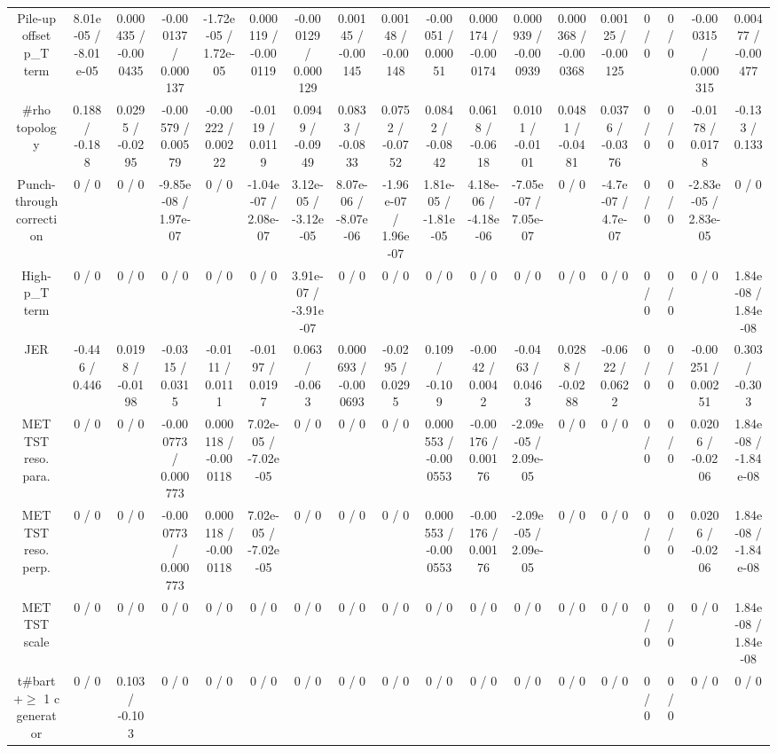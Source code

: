 \documentclass[10pt]{article}
\begin{document}
\begin{table}[htbp]
\begin{center}
\begin{tabular}{|c|c|c|c|c|c|c|c|c|c|c|c|c|c|c|c|c|c|}
  Pile-up offset p_{T} term & 8.01e-05 / -8.01e-05 & 0.000435 / -0.000435 & -0.000137 / 0.000137 & -1.72e-05 / 1.72e-05 & 0.000119 / -0.000119 & -0.000129 / 0.000129 & 0.00145 / -0.00145 & 0.00148 / -0.00148 & -0.00051 / 0.00051 & 0.000174 / -0.000174 & 0.000939 / -0.000939 & 0.000368 / -0.000368 & 0.00125 / -0.00125 & 0 / 0 & 0 / 0 & -0.000315 / 0.000315 & 0.00477 / -0.00477 \\ 
  #rho topology & 0.188 / -0.188 & 0.0295 / -0.0295 & -0.00579 / 0.00579 & -0.00222 / 0.00222 & -0.0119 / 0.0119 & 0.0949 / -0.0949 & 0.0833 / -0.0833 & 0.0752 / -0.0752 & 0.0842 / -0.0842 & 0.0618 / -0.0618 & 0.0101 / -0.0101 & 0.0481 / -0.0481 & 0.0376 / -0.0376 & 0 / 0 & 0 / 0 & -0.0178 / 0.0178 & -0.133 / 0.133 \\ 
  Punch-through correction & 0 / 0 & 0 / 0 & -9.85e-08 / 1.97e-07 & 0 / 0 & -1.04e-07 / 2.08e-07 & 3.12e-05 / -3.12e-05 & 8.07e-06 / -8.07e-06 & -1.96e-07 / 1.96e-07 & 1.81e-05 / -1.81e-05 & 4.18e-06 / -4.18e-06 & -7.05e-07 / 7.05e-07 & 0 / 0 & -4.7e-07 / 4.7e-07 & 0 / 0 & 0 / 0 & -2.83e-05 / 2.83e-05 & 0 / 0 \\ 
  High-p_{T} term & 0 / 0 & 0 / 0 & 0 / 0 & 0 / 0 & 0 / 0 & 3.91e-07 / -3.91e-07 & 0 / 0 & 0 / 0 & 0 / 0 & 0 / 0 & 0 / 0 & 0 / 0 & 0 / 0 & 0 / 0 & 0 / 0 & 0 / 0 & 1.84e-08 / 1.84e-08 \\ 
  JER & -0.446 / 0.446 & 0.0198 / -0.0198 & -0.0315 / 0.0315 & -0.0111 / 0.0111 & -0.0197 / 0.0197 & 0.063 / -0.063 & 0.000693 / -0.000693 & -0.0295 / 0.0295 & 0.109 / -0.109 & -0.0042 / 0.0042 & -0.0463 / 0.0463 & 0.0288 / -0.0288 & -0.0622 / 0.0622 & 0 / 0 & 0 / 0 & -0.00251 / 0.00251 & 0.303 / -0.303 \\ 
  MET TST reso. para. & 0 / 0 & 0 / 0 & -0.000773 / 0.000773 & 0.000118 / -0.000118 & 7.02e-05 / -7.02e-05 & 0 / 0 & 0 / 0 & 0 / 0 & 0.000553 / -0.000553 & -0.00176 / 0.00176 & -2.09e-05 / 2.09e-05 & 0 / 0 & 0 / 0 & 0 / 0 & 0 / 0 & 0.0206 / -0.0206 & 1.84e-08 / -1.84e-08 \\ 
  MET TST reso. perp. & 0 / 0 & 0 / 0 & -0.000773 / 0.000773 & 0.000118 / -0.000118 & 7.02e-05 / -7.02e-05 & 0 / 0 & 0 / 0 & 0 / 0 & 0.000553 / -0.000553 & -0.00176 / 0.00176 & -2.09e-05 / 2.09e-05 & 0 / 0 & 0 / 0 & 0 / 0 & 0 / 0 & 0.0206 / -0.0206 & 1.84e-08 / -1.84e-08 \\ 
  MET TST scale & 0 / 0 & 0 / 0 & 0 / 0 & 0 / 0 & 0 / 0 & 0 / 0 & 0 / 0 & 0 / 0 & 0 / 0 & 0 / 0 & 0 / 0 & 0 / 0 & 0 / 0 & 0 / 0 & 0 / 0 & 0 / 0 & 1.84e-08 / 1.84e-08 \\ 
  t#bar{t}+$\geq$ 1 c generator & 0 / 0 & 0.103 / -0.103 & 0 / 0 & 0 / 0 & 0 / 0 & 0 / 0 & 0 / 0 & 0 / 0 & 0 / 0 & 0 / 0 & 0 / 0 & 0 / 0 & 0 / 0 & 0 / 0 & 0 / 0 & 0 / 0 & 0 / 0 \\ 

\end{tabular}
\end{center}
\end{table}
\end{document}
